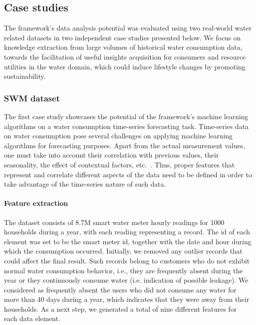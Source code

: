 \subsection{Case studies}
\label{subsec:case_studies}
The framework's data analysis potential was evaluated using two real-world water related datasets in two independent case studies presented below. We focus on knowledge extraction from large volumes of historical water consumption data, towards the facilitation of useful insights acquisition for consumers and resource utilities in the water domain, which could induce lifestyle changes by promoting sustainability.

\subsubsection{SWM dataset}
\label{subsubsec:case_study1}
The first case study showcases the potential of the framework's machine learning algorithms on a water consumption time-series forecasting task. Time-series data on water consumption pose several challenges on applying machine learning algorithms for forecasting purposes. Apart from the actual measurement values, one must take into account their correlation with previous values, their seasonality, the effect of contextual factors, etc.~\cite{wrcr12805}. Thus, proper features that represent and correlate different aspects of the data need to be defined in order to take advantage of the time-series nature of such data.

\paragraph{Feature extraction}
\label{par:feat_extr1}
The dataset consists of 8.7M smart water meter hourly readings for 1000 households during a year, with each reading representing a record. The id of each element was set to be the smart meter id, together with the date and hour during which the consumption occurred. Initially, we removed any outlier records that could affect the final result. Such records belong to customers who do not exhibit normal water consumption behavior, i.e., they are frequently absent during the year or they continuously consume water (i.e. indication of possible leakage). We considered as frequently absent the users who did not consume any water for more than 40 days during a year, which indicates that they were away from their households. As a next step, we generated a total of nine different features for each data element. 

